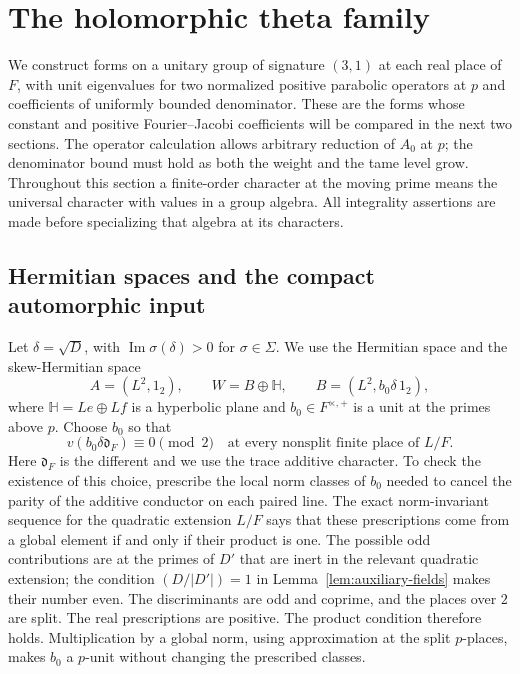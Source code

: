\section{The holomorphic theta family}\label{sec:theta}

We construct forms on a unitary group of signature $(3,1)$ at each real
place of $F$, with unit eigenvalues for two normalized positive
parabolic operators at $p$ and coefficients of uniformly bounded
denominator.  These are the forms
whose constant and positive Fourier--Jacobi coefficients will be compared
in the next two sections.  The operator calculation allows arbitrary
reduction of $A_0$ at $p$; the denominator bound must hold as both the
weight and the tame level grow.  Throughout this section a finite-order
character at the moving prime means the universal character with values
in a group algebra.  All
integrality assertions are made before specializing that algebra at its
characters.

\subsection{Hermitian spaces and the compact automorphic input}

Let $\delta=\sqrt D$, with $\operatorname{Im}\sigma(\delta)>0$ for
$\sigma\in\Sigma$.  We use the Hermitian space and the skew-Hermitian space
\begin{equation}\label{eq:theta-spaces}
 A=(L^2,1_2),\qquad
 W=B\oplus\mathbb H,\qquad
 B=(L^2,b_0\delta\,1_2),
\end{equation}
where $\mathbb H=Le\oplus Lf$ is a hyperbolic plane and
$b_0\in F^{\times,+}$ is a unit at the primes above $p$.  Choose $b_0$ so that
\begin{equation}\label{eq:lattice-parities}
 v(b_0\delta\mathfrak d_F)\equiv0\pmod2
 \quad\text{at every nonsplit finite place of }L/F.
\end{equation}
Here $\mathfrak d_F$ is the different and we use the trace additive
character.  To check the existence of this choice, prescribe the local
norm classes of $b_0$ needed to cancel the parity of the additive conductor
on each paired line.  The exact norm-invariant sequence for the quadratic
extension $L/F$ says that these prescriptions come from a global element
if and only if their product is one.  The possible odd contributions are
at the primes of $D'$ that are inert in the relevant quadratic extension;
the condition $(D/|D'|)=1$ in Lemma~\ref{lem:auxiliary-fields} makes their
number even.  The discriminants are odd and coprime, and the places over
$2$ are split.  The real prescriptions are positive.  The product condition
therefore holds.  Multiplication by a global norm, using approximation at
the split $p$-places, makes $b_0$ a $p$-unit without changing the prescribed
classes.

